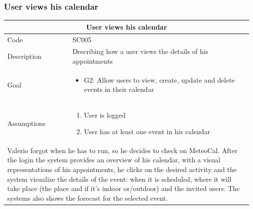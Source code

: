 \documentclass[10pt,a4paper,titlepage]{article}
\begin{document}
\subsubsection{User views his calendar}
\begin{tabular}{| p{3cm} | p{10cm} |}
\hline \multicolumn{2}{|c|}{\textbf{User views his calendar}} \\ 
\hline Code & SC005 \\ 
\hline Description & Describing how a user views the details of his appointments \\
\hline Goal & \begin{itemize}\item G2: Allow users to view, create, update and delete events in their calendar\end{itemize}\\
\hline Assumptions & \begin{enumerate}
\item User is logged
\item User has at least one event in his calendar
\end{enumerate} \\
\hline \multicolumn{2}{|p{13cm}|}{Valerio forgot when he has to run, so he decides to check on MeteoCal. After the login the system provides an overview of his calendar, with a visual representations of his appointments, he clicks on the desired activity and the system visualize the details of the event: when it is scheduled, where it will take place (the place and if it's indoor or/outdoor) and the invited users. The systems also shows the forecast for the selected event.}\\
\hline
\end{tabular}
\end{document}

